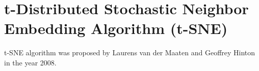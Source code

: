 \section{t-Distributed Stochastic Neighbor Embedding Algorithm (t-SNE)\label{Sec:DR:t-SNE}}
t-SNE algorithm was proposed by Laurens van der Maaten and Geoffrey Hinton in the year 2008.\cite{vandermaatenJMLR2008}